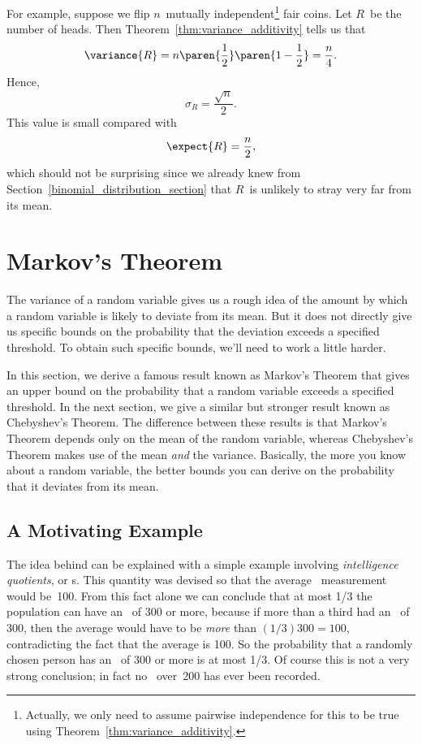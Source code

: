 For example, suppose we flip $n$~mutually
independent\footnote{Actually, we only need to assume pairwise
  independence for this to be true using
  Theorem~\ref{thm:variance_additivity}.} fair coins.  Let $R$~be the
number of heads.  Then Theorem~\ref{thm:variance_additivity} tells us
that
\begin{equation*}
    \variance{R} = n \paren{\frac{1}{2}} \paren{1 - \frac{1}{2}}
                 = \frac{n}{4}.
\end{equation*}
Hence,
\begin{equation*}
    \sigma_R = \frac{\sqrt{n}}{2}.
\end{equation*}
This value is small compared with
\begin{equation*}
    \expect{R} = \frac{n}{2},
\end{equation*}
which should not be surprising since we already knew from
Section~\ref{binomial_distribution_section} that $R$~is unlikely to
stray very far from its mean.

\section{Markov's Theorem}

The variance of a random variable gives us a rough idea of the amount
by which a random variable is likely to deviate from its mean.  But it
does not directly give us specific bounds on the probability that the
deviation exceeds a specified threshold.  To obtain such specific
bounds, we'll need to work a little harder.

In this section, we derive a famous result known as Markov's Theorem
that gives an upper bound on the probability that a random variable
exceeds a specified threshold.  In the next section, we give a similar
but stronger result known as Chebyshev's Theorem.  The difference
between these results is that Markov's Theorem depends only on the
mean of the random variable, whereas Chebyshev's Theorem makes use of
the mean \emph{and} the variance.  Basically, the more you know about
a random variable, the better bounds you can derive on the probability
that it deviates from its mean.

\subsection{A Motivating Example}


The idea behind  can be explained with a simple
example involving \emph{intelligence quotients}, or \IQ s.  This
quantity was devised so that the average \IQ\ measurement would
be~100.  From this fact alone we can conclude that at most 1/3 the
population can have an \IQ\ of 300 or more, because if more than a
third had an \IQ\ of 300, then the average would have to be
\emph{more} than $(1/3)300 = 100$, contradicting the fact that the
average is 100.  So the probability that a randomly chosen person has
an \IQ\ of 300 or more is at most 1/3.  Of course this is not a very
strong conclusion; in fact no \IQ\ over~200 has ever been recorded.

